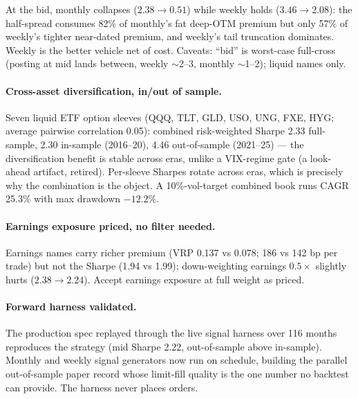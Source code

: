 At the bid, monthly collapses ($2.38 \to 0.51$) while weekly holds
($3.46 \to 2.08$): the half-spread consumes 82\% of monthly's fat
deep-OTM premium but only 57\% of weekly's tighter near-dated premium,
and weekly's tail truncation dominates. Weekly is the better vehicle net
of cost. Caveats: ``bid'' is worst-case full-cross (posting at mid lands
between, weekly $\sim$2--3, monthly $\sim$1--2); liquid names only.

\paragraph{Cross-asset diversification, in/out of sample.} Seven liquid
ETF option sleeves (QQQ, TLT, GLD, USO, UNG, FXE, HYG; average pairwise
correlation 0.05): combined risk-weighted Sharpe 2.33 full-sample, 2.30
in-sample (2016--20), 4.46 out-of-sample (2021--25) --- the
diversification benefit is stable across eras, unlike a VIX-regime gate
(a look-ahead artifact, retired). Per-sleeve Sharpes rotate across eras,
which is precisely why the combination is the object. A 10\%-vol-target
combined book runs CAGR 25.3\% with max drawdown $-12.2\%$.

\paragraph{Earnings exposure priced, no filter needed.} Earnings names
carry richer premium (VRP 0.137 vs 0.078; 186 vs 142 bp per trade) but
not the Sharpe (1.94 vs 1.99); down-weighting earnings $0.5\times$
slightly hurts ($2.38 \to 2.24$). Accept earnings exposure at full
weight as priced.

\paragraph{Forward harness validated.} The production spec replayed
through the live signal harness over 116 months reproduces the strategy
(mid Sharpe 2.22, out-of-sample above in-sample). Monthly and weekly
signal generators now run on schedule, building the parallel
out-of-sample paper record whose limit-fill quality is the one number no
backtest can provide. The harness never places orders.



